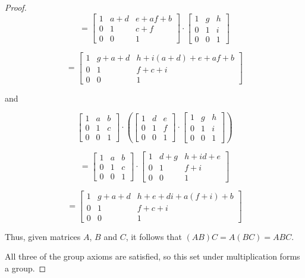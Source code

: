 \documentclass{article}
\begin{document}
\begin{proof}
\[
=
\begin{bmatrix}
    1 & a+d & e+af+b \\
    0 & 1 & c+f \\
    0 & 0 & 1
    \end{bmatrix}
    \cdot
    \begin{bmatrix}
    1 & g & h \\
    0 & 1 & i \\
    0 & 0 & 1
    \end{bmatrix}
\]

\[
=
\begin{bmatrix}
    1 & g+a+d & h+i(a+d)+e+af+b \\
    0 & 1 & f+c+i \\
    0 & 0 & 1
    \end{bmatrix}
\]

and

\[
\begin{bmatrix}
    1 & a & b \\
    0 & 1 & c \\
    0 & 0 & 1
    \end{bmatrix}
    \cdot
    \left(\begin{bmatrix}
    1 & d & e \\
    0 & 1 & f \\
    0 & 0 & 1
    \end{bmatrix}
    \cdot
    \begin{bmatrix}
    1 & g & h \\
    0 & 1 & i \\
    0 & 0 & 1
    \end{bmatrix}\right)
\]

\[
=
\begin{bmatrix}
    1 & a & b \\
    0 & 1 & c \\
    0 & 0 & 1
    \end{bmatrix}
    \cdot
    \begin{bmatrix}
    1 & d+g & h+id+e \\
    0 & 1 & f+i \\
    0 & 0 & 1
    \end{bmatrix}
\]

\[
=
\begin{bmatrix}
    1 & g+a+d & h+e+di+a(f+i)+b \\
    0 & 1 & f+c+i \\
    0 & 0 & 1
    \end{bmatrix}
\]

Thus, given matrices $A$, $B$ and $C$, it follows that $(AB)C = A(BC) = ABC$.

All three of the group axioms are satisfied, so this set under multiplication forms a group.


\end{proof}
\end{document}
